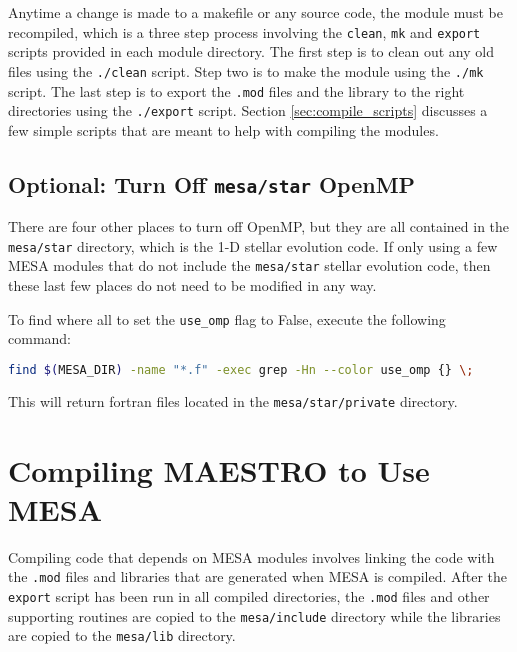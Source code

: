 Anytime a change is made to a makefile or any source code, the module must 
be recompiled, which is a three step process involving the {\tt clean}, 
{\tt mk} and {\tt export} scripts provided in each module directory. The 
first step is to clean out any old files using the {\tt ./clean} script. 
Step two is to make the module using the {\tt ./mk} script. The last step is 
to export the {\tt .mod} files and the library to the right directories using 
the {\tt ./export} script. Section \ref{sec:compile_scripts} discusses a few 
simple scripts that are meant to help with compiling the modules.

\subsection{Optional: Turn Off {\tt mesa/star} OpenMP}
There are four other places to turn off OpenMP, but they are all contained 
in the {\tt mesa/star} directory, which is the 1-D stellar evolution code. If 
only using a few {\sf MESA} modules that do not include the {\tt mesa/star} 
stellar evolution code, then these last few places do not need to be 
modified in any way. 

To find where all to set the {\tt use\_omp} flag to False, execute the 
following command:
\begin{lstlisting}[language=bash,mathescape=false]
  find $(MESA_DIR) -name "*.f" -exec grep -Hn --color use_omp {} \;
\end{lstlisting}
This will return fortran files located in the {\tt mesa/star/private} 
directory.

\section{Compiling {\sf MAESTRO} to Use {\sf MESA}}

Compiling code that depends on {\sf MESA} modules involves linking the code 
with the {\tt .mod} files and libraries that are generated when {\sf MESA} 
is compiled. After the {\tt export} script has been run in all compiled 
directories, the {\tt .mod} files and other supporting routines are 
copied to the {\tt mesa/include} directory while the libraries are copied to 
the {\tt mesa/lib} directory.

